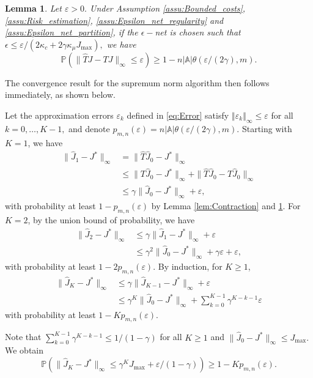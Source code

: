 \documentclass[12pt,technote,onecolumn]{IEEEtran}
\newtheorem{lemma}{Lemma}
\begin{document}
\begin{lemma}
	\label{lem:Contraction operators error} Let $\varepsilon>0.$
	Under Assumption \ref{assu:Bounded_costs}, \ref{assu:Risk_estimation},
	\ref{assu:Epsilon_net_regularity} and \ref{assu:Epsilon_net_partition},
	if the $\epsilon-$net is chosen such that
	$
	\epsilon\leq{\varepsilon}/{\left(2\kappa_{c}+2\gamma\kappa_{\mu}J_{\max}\right)},
	$
	we have	
	$$
	\mathbb{P}(\|\widehat{T}J-TJ\|_{\infty}\leq\varepsilon)\geq1-n|\mathbb{A}|\theta({\varepsilon}/({2\gamma}),m).
	$$	
\end{lemma}

The convergence result for the supremum norm algorithm then follows
immediately, as shown below.
\begin{IEEEproof}
	Let the approximation errors $\varepsilon_{k}$ defined in \eqref{eq:Error} satisfy $\left\Vert \varepsilon_{k}\right\Vert _{\infty}\leq\varepsilon$
for all $k=0,\dots,K-1,$ and denote $p_{m,n}\left(\varepsilon\right)=n\left|\mathbb{A}\right|\theta\left({\varepsilon}/(2\gamma),m\right).$
Starting with $K=1$, we have
\begin{equation*}
\begin{aligned}
\|\widehat{J}_{1}-J^{*}\|_{\infty}&=\|\widehat{T}\widehat{J}_{0}-J^{*}\|_{\infty}\\
&\leq\|T\widehat{J}_{0}-J^{*}\|_{\infty}+\|\widehat{T}\widehat{J}_{0}-T\widehat{J}_{0}\|_{\infty}\\
&\leq\gamma\|\widehat{J}_{0}-J^{*}\|_{\infty}+\varepsilon,
\end{aligned}
\end{equation*}
with probability at least $1-p_{m,n}\left(\varepsilon\right)$ by Lemma
\ref{lem:Contraction} and \ref{lem:Contraction operators error}.
For $K=2$, by the union bound of probability, we have
\begin{equation*}
\begin{aligned}
\|\widehat{J}_{2}-J^{*}\|_{\infty}&\leq\gamma\|\widehat{J}_{1}-J^{*}\|_{\infty}+\varepsilon\\
&\leq\gamma^{2}\|\widehat{J}_{0}-J^{*}\|_{\infty}+\gamma\varepsilon+\varepsilon,
\end{aligned}
\end{equation*}
with probability at least $1-2p_{m,n}\left(\varepsilon\right)$. By
induction, for $K\geq1$, 
\begin{equation*}
\begin{aligned}
\|\widehat{J}_{K}-J^{*}\|_{\infty}&\leq\gamma\|\widehat{J}_{K-1}-J^{*}\|_{\infty}+\varepsilon\\
&\leq\gamma^{K}\|\widehat{J}_{0}-J^{*}\|_{\infty}+\sum_{k=0}^{K-1}\gamma^{K-k-1}\varepsilon
\end{aligned}
\end{equation*}
with probability at least $1-Kp_{m,n}\left(\varepsilon\right)$.	

Note that $\sum_{k=0}^{K-1}\gamma^{K-k-1}\leq1/\left(1-\gamma\right)$
for all $K\geq1$ and $\|\widehat{J}_{0}-J^{*}\|_{\infty}\leq J_{\max}.$
We obtain	
$$
\mathbb{P}\left(\|\widehat{J}_{K}-J^{*}\|_{\infty}\leq\gamma^{K}J_{\max}+{\varepsilon}/{(1-\gamma)}\right)\geq1-Kp_{m,n}\left(\varepsilon\right).
$$
\end{IEEEproof}
\end{document}
